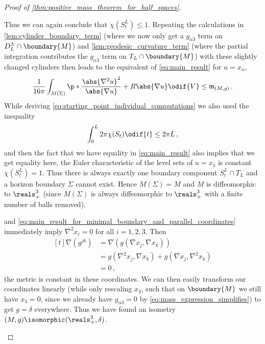 \documentclass[titlepage,numbers=noenddot,oneside,%
cleardoublepage=empty,paper=a4,fontsize=11pt,%
english,%
]{scrartcl}
\newcommand*{\mathcomma}{\,,}
\newcommand*{\mathfullstop}{\,.}
\newcommand{\mass}[2]{\mathfrak{m}_{(#1,#2)}} %
\begin{document}
\begin{proof}[Proof of \cref{thm:positive_mass_theorem_for_half_spaces}]
\begin{proofdescription}
        Thus we can again conclude that \( \chi(S_t^L)\leq 1 \). Repeating the calculations in \cref{lem:cylinder_boundary_term} (where we now only get a \( g_{\alpha 3} \) term on \( D_L^{\pm}\cap \boundary{M} \)) and \cref{lem:geodesic_curvature_term} (where the partial integration contributes the \( g_{\alpha 3} \) term on \( T_L\cap \boundary{M} \)) with these slightly changed cylinders then leads to the equivalent of \cref{eq:main_result} for \( u=x_\alpha \),
        \begin{equation}
            \label{eq:main_result_for_minimal_boundary_and_parallel_coordinates}
            \frac{1}{16\pi}\int_{M(\Sigma)}\p*{\frac{\abs{\nabla^2 u}^2}{\abs{\nabla u}}+R\abs{\nabla u}}\odif{V}\leq \mass{M}{g}\mathfullstop
        \end{equation}
        While deriving \cref{eq:starting_point_individual_computations} we also used the inequality
        \begin{equation*}
            \int_{0}^{L}2\pi \chi(S_t)\odif{t}\leq 2\pi L\mathcomma
        \end{equation*}
        and then the fact that we have equality in \cref{eq:main_result} also implies that we get equality here, \ie the Euler characteristic of the level sets of \( u=x_3 \) is constant \( \chi(S_t^L)=1 \). Thus there is always exactly one boundary component \( S_t^L\cap T_L \) and a horizon boundary \( \Sigma \) cannot exist. Hence \( M(\Sigma)=M \) and \( M \) is diffeomorphic to \( \reals^3_+ \) (since \( M(\Sigma) \) is always diffeomorphic to \( \reals^3_+ \) with a finite number of balls removed). 

         and \cref{eq:main_result_for_minimal_boundary_and_parallel_coordinates} immediately imply \( \nabla^2 x_i=0 \) for all \( i=1,2,3 \). Then
        \begin{equation*}
            \begin{aligned}[t]
                \nabla (g^{jk})&=\nabla(g(\nabla x_j,\nabla x_k))\\
                &=g(\nabla^2 x_j,\nabla x_k)+g(\nabla x_j,\nabla^2 x_k)\\
                &=0\mathcomma
            \end{aligned}
        \end{equation*}
        \ie the metric is constant in these coordinates. We can then easily transform our coordinates linearly (while only rescaling \( x_3 \), such that on \( \boundary{M} \) we still have \( x_3=0 \), since we already have \( g_{\alpha 3}=0 \) by \cref{eq:mass_expression_simplifies}) to get \( g=\delta \) everywhere. Thus we have found an isometry \( (M,g)\isomorphic (\reals^3_+,\delta) \).
    \end{proofdescription}
\end{proof}
\end{document}
